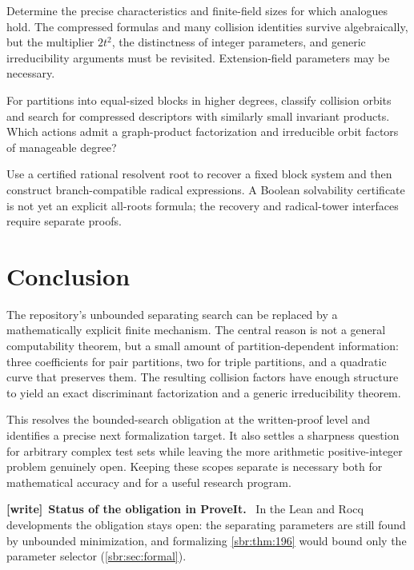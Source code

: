 \documentclass[11pt,letterpaper]{article}
\numberwithin{equation}{section}
\theoremstyle{definition}
\theoremstyle{remark}
\newenvironment{writenote}[1][]{\par\smallskip\begingroup\small
 \noindent\textbf{[write]}\if\relax\detokenize{#1}\relax\else~\textbf{#1.}\fi\ }%
 {\par\endgroup\smallskip}
\begin{document}
\begin{question}
Determine the precise characteristics and finite-field sizes for which
analogues hold. The compressed formulas and many collision identities
survive algebraically, but the multiplier $2t^2$, the distinctness of
integer parameters, and generic irreducibility arguments must be
revisited. Extension-field parameters may be necessary.
\end{question}

\begin{question}
For partitions into equal-sized blocks in higher degrees, classify
collision orbits and search for compressed descriptors with similarly
small invariant products. Which actions admit a graph-product
factorization and irreducible orbit factors of manageable degree?
\end{question}

\begin{question}
Use a certified rational resolvent root to recover a fixed block system
and then construct branch-compatible radical expressions. A Boolean
solvability certificate is not yet an explicit all-roots formula; the
recovery and radical-tower interfaces require separate proofs.
\end{question}

\section{Conclusion}

The repository's unbounded separating search can be replaced by a
mathematically explicit finite mechanism. The central reason is not a
general computability theorem, but a small amount of partition-dependent
information: three coefficients for pair partitions, two for triple
partitions, and a quadratic curve that preserves them. The resulting
collision factors have enough structure to yield an exact discriminant
factorization and a generic irreducibility theorem.

This resolves the bounded-search obligation at the written-proof level
and identifies a precise next formalization target. It also settles a
sharpness question for arbitrary complex test sets while leaving the more
arithmetic positive-integer problem genuinely open. Keeping these scopes
separate is necessary both for mathematical accuracy and for a useful
research program.

\begin{writenote}[Status of the obligation in ProveIt]
In the Lean and Rocq developments the obligation stays open: the
separating parameters are still found by unbounded minimization, and
formalizing \cref{sbr:thm:196} would bound only the parameter selector
(\cref{sbr:sec:formal}).
\end{writenote}
\end{document}

